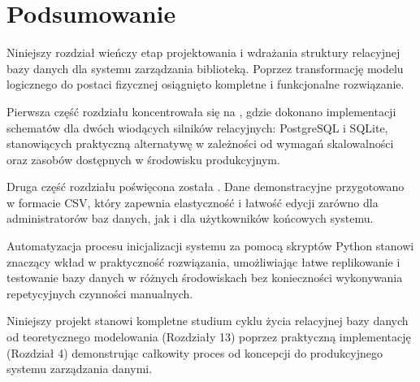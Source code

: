 \documentclass[letterpaper,10pt,english]{sphinxmanual}
\begin{document}
\begin{sphinxVerbatim}[commandchars=\\\{\}]

       
\end{sphinxVerbatim}


\section{Podsumowanie}
\label{\detokenize{rozdzial_4/index:podsumowanie}}
\sphinxAtStartPar
Niniejszy rozdział wieńczy etap projektowania i wdrażania struktury relacyjnej bazy danych dla systemu zarządzania biblioteką. Poprzez transformację modelu logicznego do postaci fizycznej osiągnięto kompletne i funkcjonalne rozwiązanie.

\sphinxAtStartPar
Pierwsza część rozdziału koncentrowała się na , gdzie dokonano implementacji schematów dla dwóch wiodących silników relacyjnych: PostgreSQL i SQLite, stanowiących praktyczną alternatywę w zależności od wymagań skalowalności oraz zasobów dostępnych w środowisku produkcyjnym.

\sphinxAtStartPar
Druga część rozdziału poświęcona została . Dane demonstracyjne przygotowano w formacie CSV, który zapewnia elastyczność i łatwość edycji zarówno dla administratorów baz danych, jak i dla użytkowników końcowych systemu.

\sphinxAtStartPar
Automatyzacja procesu inicjalizacji systemu za pomocą skryptów Python stanowi znaczący wkład w praktyczność rozwiązania, umożliwiając łatwe replikowanie i testowanie bazy danych w różnych środowiskach bez konieczności wykonywania repetycyjnych czynności manualnych.

\sphinxAtStartPar
Niniejszy projekt stanowi kompletne studium cyklu życia relacyjnej bazy danych \textendash{} od teoretycznego modelowania (Rozdziały 1\sphinxhyphen{}3) poprzez praktyczną implementację (Rozdział 4) \textendash{} demonstrując całkowity proces od koncepcji do produkcyjnego systemu zarządzania danymi.
\end{document}
